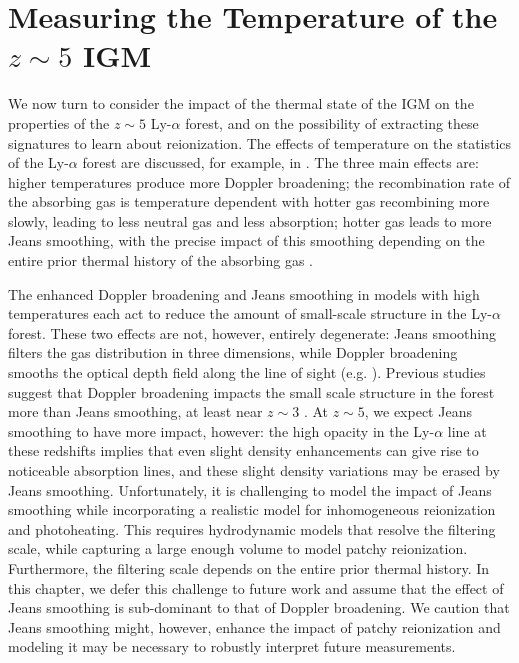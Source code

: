 \section{Measuring the Temperature of the $z \sim 5$ IGM}
\label{sec:IGMTemperaturetemp_measure}

We now turn to consider the impact of the thermal state of the IGM on the properties of the $z \sim 5$ Ly-$\alpha$ 
forest, and
on the possibility of extracting these signatures to learn about reionization. The effects of temperature
on the statistics of the Ly-$\alpha$ forest are discussed, for example, in \citet{Lidz:2009ca}. The three main effects 
are: higher temperatures produce more Doppler broadening; the recombination rate of the absorbing gas is temperature
dependent with hotter gas recombining more slowly, leading to less neutral gas and less absorption; hotter gas leads
to more Jeans smoothing, with the precise impact of this smoothing depending on the entire prior thermal history of the absorbing gas
\citep{Gnedin:1997td}. 

The enhanced Doppler broadening and Jeans smoothing in models with high temperatures each act to reduce the amount of small-scale structure in the Ly-$\alpha$ forest.
These two effects are not, however, entirely degenerate: Jeans smoothing filters the gas distribution in three dimensions, while
Doppler broadening smooths the optical depth field along the line of sight 
(e.g. \citealt{Zaldarriaga:2000mz}). Previous studies suggest that Doppler broadening impacts the small scale structure in the
forest more than Jeans smoothing, at least near $z \sim 3$ \citep{Zaldarriaga:2000mz,Peeples:2009ue,Lidz:2009ca}. At $z \sim 5$, we 
expect Jeans smoothing to have more impact, however: the high opacity in the Ly-$\alpha$ line at these redshifts implies that even slight
density enhancements can give rise to noticeable absorption lines, and these slight density variations may be erased by Jeans
smoothing. Unfortunately, it is challenging to model the impact of Jeans smoothing while incorporating a realistic model
for inhomogeneous reionization and photoheating. This requires hydrodynamic models that resolve the filtering scale, while capturing
a large enough volume to model patchy reionization. Furthermore, the filtering scale depends on the entire prior thermal history. 
In this chapter, we defer this challenge to future work and assume that the effect of Jeans smoothing is sub-dominant
to that of Doppler broadening. We caution that Jeans smoothing might, however, enhance the impact of patchy reionization and 
modeling it may be necessary to robustly interpret future measurements. 

